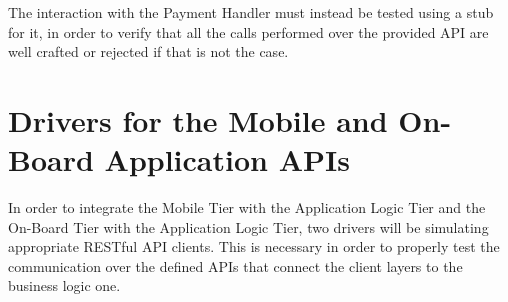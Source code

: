 The interaction with the Payment Handler must instead be tested using a stub for it, in order to verify that all the calls performed over the provided API are well crafted or rejected if that is not the case.

\section{Drivers for the Mobile and On-Board Application APIs}
In order to integrate the Mobile Tier with the Application Logic Tier and the On-Board Tier with the Application Logic Tier, two drivers will be simulating appropriate RESTful API clients. This is necessary in order to properly test the communication over the defined APIs that connect the client layers to the business logic one.
